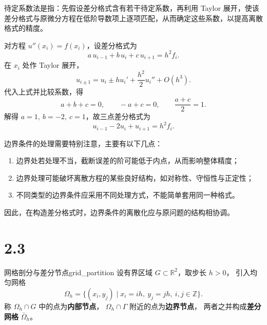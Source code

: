 \begin{definition}[待定系数法]
待定系数法是指：先假设差分格式含有若干待定系数，再利用 Taylor 展开，使该差分格式与原微分方程在低阶导数项上逐项匹配，从而确定这些系数，以提高离散格式的精度。
\end{definition}

\begin{example}
对方程 \(u''(x_i)=f(x_i)\)，设差分格式为
\[
a\,u_{i-1}+b\,u_i+c\,u_{i+1}=h^2f_i.
\]
在 \(x_i\) 处作 Taylor 展开，
\[
u_{i\pm1}=u_i\pm hu_i'+\frac{h^2}{2}u_i''+O(h^3).
\]
代入上式并比较系数，得
\[
a+b+c=0,\qquad -a+c=0,\qquad \frac{a+c}{2}=1.
\]
解得 \(a=1,\ b=-2,\ c=1\)，故三点差分格式为
\[
u_{i-1}-2u_i+u_{i+1}=h^2f_i.
\]
\end{example}
\begin{note}
边界条件的处理需要特别注意，主要有以下几点：
\begin{enumerate}
    \item 边界处若处理不当，截断误差的阶可能低于内点，从而影响整体精度；
    \item 边界处理可能破坏离散方程的某些良好结构，如对称性、守恒性与正定性；
    \item 不同类型的边界条件应采用不同处理方式，不能简单套用同一种格式。
\end{enumerate}
因此，在构造差分格式时，边界条件的离散化应与原问题的结构相协调。
\end{note}
\section{2.3}
\begin{definition}{网格剖分与差分节点}{grid_partition}
设有界区域 $G \subset \mathbb{R}^2$，取步长 $h > 0$，
引入均匀网格
\[
    \Omega_h = \{(x_i, y_j) \mid x_i = ih,\ y_j = jh,\ i,j \in \mathbb{Z}\}.
\]
称 $\Omega_h \cap G$ 中的点为\textbf{内部节点}，
$\Omega_h \cap \Gamma$ 附近的点为\textbf{边界节点}，
两者之并构成\textbf{差分网格} $\bar{\Omega}_h$。
\end{definition}

